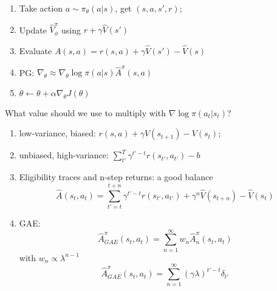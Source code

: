 \documentclass{article}
\begin{document}
\begin{enumerate}
\item Take action $a\sim\pi_{\theta}(a|s)$, get $(s,a,s',r)$;
\item Update $\hat{V}_{\phi}^{\pi}$ using $r+\gamma \hat{V}(s')$
\item Evaluate $A(s,a)=r(s,a)+\gamma\hat{V}(s')-\hat{V}(s)$
\item PG: $\nabla_{\theta}\approx\nabla_{\theta}\log\pi(a|s)\hat{A}^{\pi}(s,a)$
\item $\theta\leftarrow \theta +\alpha\nabla_{\theta}J(\theta)$
\end{enumerate}
What value should we use to multiply with $\nabla\log\pi(a_t|s_t)$?
\begin{enumerate}
\item low-variance, biased: $r(s,a)+\gamma V(s_{t+1})-V(s_t)$;
\item unbiased, high-variance: $\sum_{t'}^T\gamma^{t'-t}r(s_{t'},a_{t'})-b$
\item Eligibility traces and n-step returns: a good balance
\begin{equation}
\hat{A}(s_t,a_t)=\sum_{t'=t}^{t+n}\gamma^{t'-t}r(s_{t'},a_{t'})+\gamma^n\hat{V}(s_{t+n})-\hat{V}(s_t)
\end{equation}
\item GAE:
\begin{equation}
\hat{A}_{GAE}^{\pi}(s_t,a_t)=\sum_{n=1}^{\infty}w_n\hat{A}^{\pi}_n(s_t,a_t)
\end{equation}
with $w_n \propto\lambda^{n-1}$
\begin{equation}
\hat{A}_{GAE}^{\pi}(s_t,a_t)=\sum_{n=1}^{\infty}(\gamma\lambda)^{t'-t}\delta_{t'}
\end{equation}
\end{enumerate}
\end{document}
